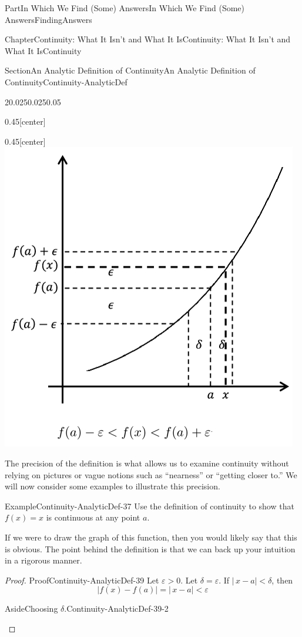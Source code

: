 \documentclass[oneside,10pt,]{book}
\numberwithin{equation}{part}
\newcommand{\eps}{\varepsilon}
\newcommand{\lt}{<}
\begin{document}
\begin{partptx}{Part}{In Which We Find (Some) Answers}{}{In Which We Find (Some) Answers}{}{}{FindingAnswers}
\begin{chapterptx}{Chapter}{Continuity: What It Isn't and What It Is}{}{Continuity: What It Isn't and What It Is}{}{}{Continuity}
\begin{sectionptx}{Section}{An Analytic Definition of Continuity}{}{An Analytic Definition of Continuity}{}{}{Continuity-AnalyticDef}
\begin{sidebyside}{2}{0.025}{0.025}{0.05}
\begin{sbspanel}{0.45}[center]
\end{sbspanel}%
\begin{sbspanel}{0.45}[center]%
\noindent\includegraphics[width=\linewidth]{external/images/Ch5fig3d.png}
\end{sbspanel}%
\end{sidebyside}%
The precision of the definition is what allows us to examine continuity without relying on pictures or vague notions such as ``nearness'' or ``getting closer to.'' We will now consider some examples to illustrate this precision.%
\begin{example}{Example}{}{Continuity-AnalyticDef-37}%
Use the definition of continuity to show that \(f(x)=x\) is continuous at any point \(a\).%
\end{example}
If we were to draw the graph of this function, then you would likely say that this is obvious.  The point behind the definition is that we can back up your intuition in a rigorous manner.%
\begin{proof}{Proof}{}{Continuity-AnalyticDef-39}
Let \(\eps>0\). Let \(\delta=\eps\). If \(|\,x-a|\lt \delta\), then%
\begin{equation*}
|f(x)-f(a)|=|\,x-a|\lt \eps
\end{equation*}
%
\begin{aside}{Aside}{Choosing \(\delta{}\).}{Continuity-AnalyticDef-39-2}%

\end{aside}
\end{proof}
\end{sectionptx}
\end{chapterptx}
\end{partptx}
\end{document}
